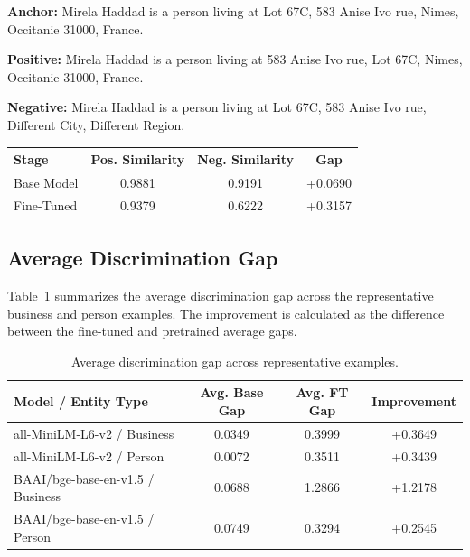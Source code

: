 \documentclass{article}
\begin{document}
\textbf{Anchor:} Mirela Haddad is a person living at Lot 67C, 583 Anise Ivo rue, Nimes, Occitanie 31000, France.

\textbf{Positive:} Mirela Haddad is a person living at 583 Anise Ivo rue, Lot 67C, Nimes, Occitanie 31000, France.

\textbf{Negative:} Mirela Haddad is a person living at Lot 67C, 583 Anise Ivo rue, Different City, Different Region.

\begin{center}
\small
\begin{tabular}{lccc}
\toprule
Stage & Pos. Similarity & Neg. Similarity & Gap \\
\midrule
Base Model & 0.9881 & 0.9191 & +0.0690 \\
Fine-Tuned & 0.9379 & 0.6222 & +0.3157 \\
\bottomrule
\end{tabular}
\end{center}


\subsection{Average Discrimination Gap}

Table~\ref{tab:gap-summary} summarizes the average discrimination gap across
the representative business and person examples. The improvement is calculated
as the difference between the fine-tuned and pretrained average gaps.

\begin{table}[t]
  \caption{Average discrimination gap across representative examples.}
  \label{tab:gap-summary}
  \centering
  \begin{tabular}{lccc}
    \toprule
    Model / Entity Type & Avg. Base Gap & Avg. FT Gap & Improvement \\
    \midrule
    all-MiniLM-L6-v2 / Business
        & 0.0349 & 0.3999 & +0.3649 \\
    all-MiniLM-L6-v2 / Person
        & 0.0072 & 0.3511 & +0.3439 \\
    BAAI/bge-base-en-v1.5 / Business
        & 0.0688 & 1.2866 & +1.2178 \\
    BAAI/bge-base-en-v1.5 / Person
        & 0.0749 & 0.3294 & +0.2545 \\
    \bottomrule
  \end{tabular}
\end{table}
\end{document}
